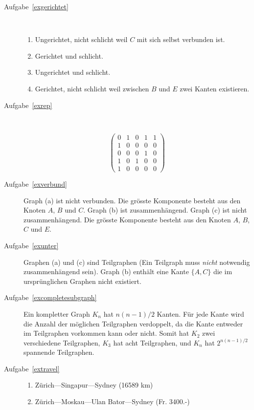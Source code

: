 \documentclass[12pt,a4paper]{report}
\theoremstyle{break}
\theoremstyle{plain}
\newcommand{\algostep}[2]{\noindent\parbox{4cm}{\scalebox{0.5}{\texttt{[image: \#1]}}}
  \hfill
  \parbox{7cm}{#2}
  \vskip -5mm
}
\begin{document}
\begin{description}
\item[Aufgabe~\ref{exgerichtet}] \hfill \\[0cm]
\begin{enumerate}
\item Ungerichtet, nicht schlicht weil $C$
  mit sich selbst verbunden ist. 
\item Gerichtet und schlicht. 
\item Ungerichtet
  und schlicht. 
\item Gerichtet, nicht schlicht weil zwischen $B$ und $E$
  zwei Kanten existieren.
\end{enumerate}
\item[Aufgabe~\ref{exrep}] \hfill \\[0cm]
\algostep{Exrep.pdf}{
\begin{displaymath}
\left( 
\begin{array}{ccccc}
0 & 1 & 0 & 1 & 1 \\
1 & 0 & 0 & 0 & 0 \\
0 & 0 & 0 & 1 & 0 \\
1 & 0 & 1 & 0 & 0 \\
1 & 0 & 0 & 0 & 0 
\end{array}
\right)
\end{displaymath}}
\item[Aufgabe~\ref{exverbund}] Graph (a) ist nicht verbunden. Die 
gr\"{o}sste Komponente besteht aus den  Knoten $A$, $B$ und $C$.
Graph (b) ist zusammenh\"{a}ngend. Graph (c) ist nicht zusammenh\"{a}ngend. Die 
gr\"{o}sste Komponente besteht aus den  Knoten $A$, $B$, $C$ und $E$.
\item[Aufgabe~\ref{exunter}] Graphen (a) und (c) sind Teilgraphen (Ein Teilgraph muss
  \emph{nicht} notwendig zusammenh\"{a}ngend sein). Graph (b)
  enth\"{a}lt eine Kante $\{A,C\}$ die im urspr\"{u}nglichen Graphen
  nicht existiert. 
\item[Aufgabe~\ref{excompletesubgraph}] 
Ein kompletter Graph $K_n$ hat $n(n-1)/2$ Kanten. F\"{u}r jede Kante 
wird die Anzahl der m\"{o}glichen Teilgraphen verdoppelt, da die Kante 
entweder im Teilgraphen vorkommen kann oder nicht. Somit hat $K_2$ zwei
verschiedene Teilgraphen, $K_3$ hat acht Teilgraphen, und $K_n$ hat $2^{n(n-1)/2}$ spannende
Teilgraphen.
\item[Aufgabe~\ref{extravel}]\hfill\linebreak
\begin{enumerate}
\item Z\"{u}rich---Singapur---Sydney (16589 km)
\item Z\"{u}rich---Moskau---Ulan Bator---Sydney (Fr. 3400.-)
\end{enumerate}
\end{description}
\end{document}
